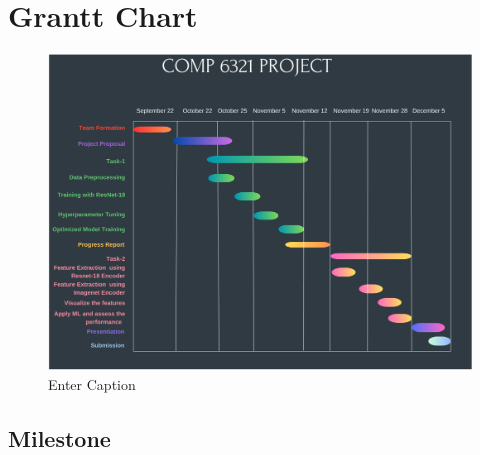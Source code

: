\documentclass[10pt,twocolumn,letterpaper]{article}
\begin{document}
\section{Grantt Chart}

\begin{figure}[H]
    \centering
    \onecolumn \includegraphics[width=\linewidth]{grantt.png}
    \caption{Enter Caption}
    \label{fig:enter-label}
\end{figure}   
\twocolumn





\subsection{Milestone}
\end{document}
